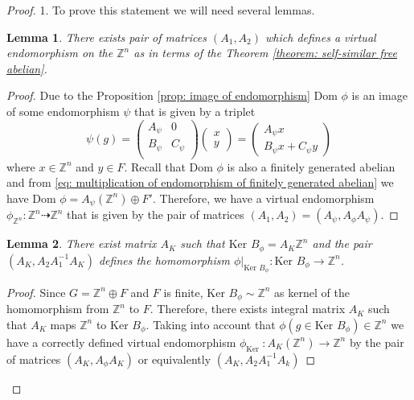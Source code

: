 \documentclass[a4paper,12pt]{amsart}
\newtheorem{lemma}{Lemma}
\theoremstyle{definition}
\newcommand{\Dom}{\text{Dom }}
\newcommand{\Ker}{\text{Ker }}
\begin{document}
	\begin{proof}
		
		1. To prove this statement we will need several lemmas. 
		
		\begin{lemma}
			There exists pair of matrices $(A_1, A_2)$ which defines a virtual endomorphism on the $\mathbb{Z}^n$ as in terms of the Theorem \ref{theorem: self-similar free abelian}.
		\end{lemma}
		
		\begin{proof}
		
		Due to the Proposition \ref{prop: image of endomorphism} $\Dom \phi$ is an image of some endomorphism $\psi$ that is given by a triplet 
		\begin{equation} \label{eq: multiplication of endomorphism of finitely generated abelian}
			\psi(g) =
			\begin{pmatrix}
				A_\psi & 0 \\
				B_\psi & C_\psi \\
			\end{pmatrix}
			\begin{pmatrix}
				x \\ 
				y 
			\end{pmatrix}
			= \begin{pmatrix}
				A_\psi x \\ 
				B_\psi x + C_\psi y
			\end{pmatrix}
		\end{equation}
		where $x \in \mathbb{Z}^n$ and $y \in F$. Recall that $\Dom \phi$ is also a finitely generated abelian and from \ref{eq: multiplication of endomorphism of finitely generated abelian} we have $\Dom \phi = A_{\psi}(\mathbb{Z}^n) \oplus F'$. Therefore, we have a virtual endomorphism $\phi_{\mathbb{Z}^n} : \mathbb{Z}^n \dashrightarrow \mathbb{Z}^n$ that is given by the pair of matrices $(A_1, A_2) = (A_\psi, A_{\phi} A_{\psi})$.
			
		\end{proof}

	 	\begin{lemma}
			There exist matrix $A_K$ such that $\Ker B_\phi = A_K \mathbb{Z}^n$ and the pair $(A_K, A_2 A_1^{-1} A_K)$ defines the homomorphism $\phi|_{\Ker B_\phi} : \Ker B_\phi \rightarrow \mathbb{Z}^n$.			
		\end{lemma}
		
		\begin{proof}
			Since $G = \mathbb{Z}^n \oplus F$ and $F$ is finite, $\Ker B_\phi \sim \mathbb{Z}^n$ as kernel of the homomorphism from $\mathbb{Z}^n$ to $F$. Therefore, there exists integral matrix $A_K$ such that $A_K$ maps $\mathbb{Z}^n$ to $\Ker B_\phi$. Taking into account that $\phi(g \in \Ker B_\phi) \in \mathbb{Z}^n$ we have a correctly defined virtual endomorphism $\phi_{\Ker} : A_K(\mathbb{Z}^n) \rightarrow \mathbb{Z}^n$ by the pair of matrices $(A_K, A_\phi A_K)$ or equivalently $(A_K, A_2A_1^{-1}A_k)$	
		\end{proof}
		

\end{proof}
\end{document}
